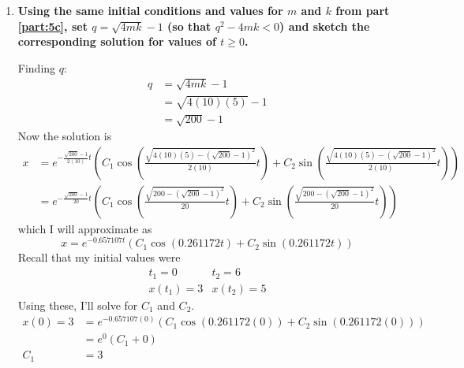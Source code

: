 \documentclass[11pt]{article}
\begin{document}
\begin{enumerate}[label={\textbf{\arabic*.}}]
{\begin{enumerate}[label={\textbf{(\alph*)}}, resume]
{                    \begin{equation*}
                        x=e^{-\frac{q}{2m}t}\left(C_1\cos\left(\frac{\sqrt{4mk-q^2}}{2m}t\right)+C_2\sin\left(\frac{\sqrt{4mk-q^2}}{2m}t\right)\right)
                    \end{equation*}
                }
                \item{
                    \textbf{\boldmath Using the same initial conditions and values for $m$ and $k$ from part \ref{part:5c}, set $q=\sqrt{4mk}-1$ (so that $q^2-4mk<0$) and sketch the corresponding solution for values of $t\ge0$.}
                    \par
                    Finding $q$:
                    \begin{align*}
                        q&=\sqrt{4mk}-1 \\
                        &=\sqrt{4(10)(5)}-1 \\
                        &=\sqrt{200}-1
                    \end{align*}
                    Now the solution is
                    \begin{align*}
                        x&=e^{-\frac{\sqrt{200}-1}{2(10)}t}\left(C_1\cos\left(\frac{\sqrt{4(10)(5)-(\sqrt{200}-1)^2}}{2(10)}t\right)+C_2\sin\left(\frac{\sqrt{4(10)(5)-(\sqrt{200}-1)^2}}{2(10)}t\right)\right) \\
                        &=e^{-\frac{\sqrt{200}-1}{20}t}\left(C_1\cos\left(\frac{\sqrt{200-(\sqrt{200}-1)^2}}{20}t\right)+C_2\sin\left(\frac{\sqrt{200-(\sqrt{200}-1)^2}}{20}t\right)\right)
                    \end{align*}
                    which I will approximate as
                    \begin{equation*}
                        x=e^{-0.657107t}(C_1\cos(0.261172t)+C_2\sin(0.261172t))
                    \end{equation*}
                    Recall that my initial values were $$\begin{matrix}t_1=0 & t_2=6 \\ x(t_1)=3 & x(t_2)=5\end{matrix}$$ Using these, I'll solve for $C_1$ and $C_2$.
                    \begin{align*}
                        x(0)=3&=e^{-0.657107(0)}(C_1\cos(0.261172(0))+C_2\sin(0.261172(0))) \\
                        &=e^0(C_1+0) \\
                        C_1&=3
                    \end{align*}
}
\end{enumerate}}
\end{enumerate}
\end{document}
